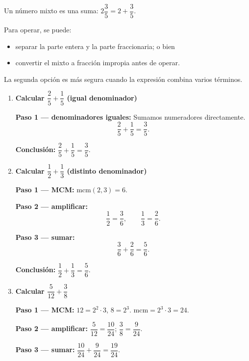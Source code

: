 \documentclass[11pt, letterpaper]{article}
\begin{document}
\begin{tcolorbox}[importantbox, title={N\'umeros mixtos como suma de entero y fracci\'on}]
Un n\'umero mixto es una suma: $2\dfrac{3}{5}=2+\dfrac{3}{5}$.

Para operar, se puede:
\begin{itemize}[itemsep=2pt]
  \item separar la parte entera y la parte fraccionaria; o bien
  \item convertir el mixto a fracci\'on impropia antes de operar.
\end{itemize}
La segunda opci\'on es m\'as segura cuando la expresi\'on combina varios t\'erminos.
\end{tcolorbox}

\begin{tcolorbox}[examplebox, title={Ejemplos --- Suma de fracciones}]
\begin{enumerate}[label=\textbf{Ej. \arabic*.}, leftmargin=*, itemsep=16pt]

\item \textbf{Calcular $\dfrac{2}{5}+\dfrac{1}{5}$ (igual denominador)}

\textbf{Paso 1 --- denominadores iguales:}
Sumamos numeradores directamente.
$$\frac{2}{5}+\frac{1}{5}=\frac{3}{5}.$$

\medskip
\textbf{Conclusi\'on:} $\dfrac{2}{5}+\dfrac{1}{5}=\dfrac{3}{5}$.

\item \textbf{Calcular $\dfrac{1}{2}+\dfrac{1}{3}$ (distinto denominador)}

\textbf{Paso 1 --- MCM:} $\text{mcm}(2,3)=6$.

\medskip
\textbf{Paso 2 --- amplificar:}
$$\frac{1}{2}=\frac{3}{6}, \qquad \frac{1}{3}=\frac{2}{6}.$$

\medskip
\textbf{Paso 3 --- sumar:}
$$\frac{3}{6}+\frac{2}{6}=\frac{5}{6}.$$

\medskip
\textbf{Conclusi\'on:} $\dfrac{1}{2}+\dfrac{1}{3}=\dfrac{5}{6}$.

\item \textbf{Calcular $\dfrac{5}{12}+\dfrac{3}{8}$}

\textbf{Paso 1 --- MCM:} $12=2^2\cdot3$, $8=2^3$. $\text{mcm}=2^3\cdot3=24$.

\medskip
\textbf{Paso 2 --- amplificar:}
$\dfrac{5}{12}=\dfrac{10}{24}$; $\dfrac{3}{8}=\dfrac{9}{24}$.

\medskip
\textbf{Paso 3 --- sumar:}
$\dfrac{10}{24}+\dfrac{9}{24}=\dfrac{19}{24}$.


\end{enumerate}
\end{tcolorbox}
\end{document}
